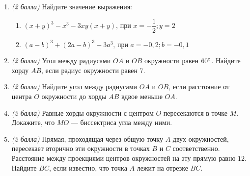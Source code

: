 \documentclass[12pt, a4paper]{article}
\begin{document}
   \cfoot{}
\begin{enumerate}
	\item \textit{(2 балла)} Найдите значение выражения: 
	\begin{enumerate}[label=\asbuk*)]
		\item $(x+y)^3-x^3-3xy(x+y)$, при $x=-\dfrac{1}{2}; y=2$
		\item $(a-b)^3+(2a-b)^3-3a^3$, при $a=-0,2; b=-0,1$
	\end{enumerate}	
	\item \textit{(2 балла)} Угол между радиусами $OA$ и $OB$ окружности равен $60\degree$. Найдите хорду $AB$, если радиус окружности равен $7$.
	\item \textit{(2 балла)} Найдите угол между радиусами $OA$ и $OB$, если расстояние от центра $O$ окружности до хорды $AB$ вдвое меньше $OA$.
	\item \textit{(2 балла)} Равные хорды окружности с центром $O$ пересекаются в точке $M$. Докажите, что $MO$ — биссектриса угла между ними.
	\item \textit{(2 балла)} Прямая, проходящая через общую точку $A$ двух окружностей, пересекает вторично эти окружности в точках $B$ и $C$ соответственно. Расстояние между проекциями центров окружностей на эту прямую равно $12$. Найдите $BC$, если известно, что точка $A$ лежит на отрезке $BC$.

\end{enumerate}
\end{document}
